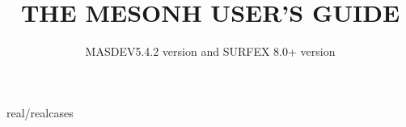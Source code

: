 \documentclass[11pt,a4paper]{book}
\begin{document}
\baselineskip=18pt
\newcommand{\dfrac}[2]{\frac{\displaystyle#1}{\displaystyle#2}}
\parindent=25pt

\setcounter{secnumdepth}{5}



\begin{titlepage}
\title{ {\bf THE MESONH USER'S GUIDE}}
\author{MASDEV5.4.2 version and SURFEX 8.0+ version }
\end{titlepage}
\maketitle
\thispagestyle{empty}
\tableofcontents








 {real/realcases}







\appendix





\printindex
{}
{}
\end{document}
